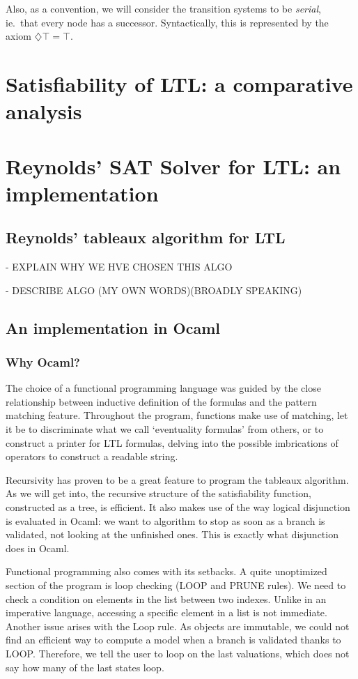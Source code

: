 \documentclass[11pt]{article}
\newcommand{\dia}{{\diamondsuit}}
\begin{document}
Also, as a convention, we will consider the transition systems to be \emph{serial}, ie.~that every node has a successor. Syntactically, this is represented by the axiom $\dia\top = \top$.

\section{Satisfiability of LTL: a comparative analysis}

\section{Reynolds' SAT Solver for LTL: an implementation}
\subsection{Reynolds' tableaux algorithm for LTL}
- EXPLAIN WHY WE HVE CHOSEN THIS ALGO

- DESCRIBE ALGO (MY OWN WORDS)(BROADLY SPEAKING)

\subsection{An implementation in Ocaml}
\subsubsection*{Why Ocaml?}
The choice of a functional programming language was guided by the close relationship
between inductive definition of the formulas and the pattern matching feature.
Throughout the program, functions make use of matching, let it be to discriminate
what we call `eventuality formulas' from others, or to construct a printer
for LTL formulas, delving into the possible imbrications of operators to construct
a readable string.

Recursivity has proven to be a great feature to program the tableaux algorithm. 
As we will get into, the recursive structure of the satisfiability function,
constructed as a tree, is efficient. It also makes use of the way logical disjunction
is evaluated in Ocaml: we want to algorithm to stop as soon as a branch is validated,
not looking at the unfinished ones. This is exactly what disjunction does in Ocaml.

Functional programming also comes with its setbacks. A quite unoptimized section of 
the program is loop checking (LOOP and PRUNE rules). We need to check a condition on 
elements in the list between two indexes. Unlike in an imperative language, accessing
a specific element in a list is not immediate. Another issue arises with the Loop 
rule. As objects 
are immutable, we could not find an efficient way to compute a model when a branch is
validated thanks to LOOP. Therefore, we tell the user to loop on the last valuations,
which does not say how many of the last states loop.  
    
\end{document}
